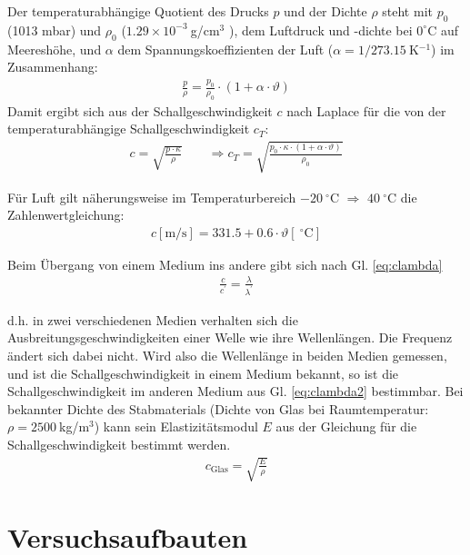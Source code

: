\documentclass{article}
\begin{document}
Der temperaturabhängige Quotient des Drucks $p$ und der Dichte $\rho$ steht mit $p_0$ (1013 mbar)
und $\rho_0$ ($1.29 \times 10^{-3}~$g/cm${}^3$ ), dem Luftdruck und -dichte bei $0^\circ$C auf Meereshöhe, und $\alpha$ dem Spannungskoeffizienten der Luft ($\alpha = 1/273.15~$K${}^{-1}$) im Zusammenhang:
\begin{align}
\frac{p}{\rho} = \frac{p_0}{\rho_0}\cdot (1 + \alpha\cdot\vartheta)
\end{align}
Damit ergibt sich aus der Schallgeschwindigkeit $c$ nach Laplace für die von der temperaturabhängige Schallgeschwindigkeit $c_T$:
\begin{align}
\label{eq:adiabatenindex}
c = \sqrt{\frac{p\cdot \kappa}{\rho}} \qquad \Rightarrow c_T = \sqrt{\frac{p_0\cdot \kappa\cdot (1 +\alpha\cdot \vartheta)}{\rho_0}}
\end{align}

Für Luft gilt näherungsweise im Temperaturbereich $-20~^\circ$C $\Rightarrow$ $40~^\circ$C die Zahlenwertgleichung:
\begin{align}
c[\text{m/s}] = 331.5 + 0.6\cdot\vartheta[{}~^\circ\text{C}]
\end{align}

Beim Übergang von einem Medium ins andere gibt sich nach Gl. \eqref{eq:clambda}
\begin{align}
\label{eq:clambda2}
\frac{c}{c^\prime} = \frac{\lambda}{\lambda^\prime}
\end{align}

d.h. in zwei verschiedenen Medien verhalten sich die Ausbreitungsgeschwindigkeiten einer Welle wie ihre Wellenlängen. Die Frequenz ändert sich dabei nicht. Wird also die Wellenlänge in beiden Medien gemessen, und ist die Schallgeschwindigkeit in einem Medium bekannt, so ist die Schallgeschwindigkeit im anderen Medium aus Gl. \eqref{eq:clambda2} bestimmbar.
Bei bekannter Dichte des Stabmaterials (Dichte von Glas bei Raumtemperatur: $\rho = 2500~$kg/m${}^3$)
kann sein Elastizitätsmodul $E$ aus der Gleichung für die Schallgeschwindigkeit bestimmt werden.
\begin{align}
\label{eq:figemodul}
c_{\text{Glas}} = \sqrt{\frac{E}{\rho}}
\end{align}

\section{Versuchsaufbauten}
\end{document}
